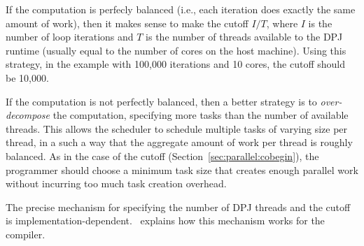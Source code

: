 If the  computation is perfecly balanced (i.e., each
iteration does exactly the same amount of work), then it makes sense
to make the cutoff $I/T$, where $I$ is the number of loop iterations
and $T$ is the number of threads available to the DPJ runtime (usually
equal to the number of cores on the host machine).  Using this
strategy, in the example with 100,000 iterations and 10 cores, the
cutoff should be 10,000.

If the computation is not perfectly balanced, then a better strategy
is to \emph{over-decompose} the computation, specifying more tasks
than the number of available threads.  This allows the scheduler to
schedule multiple tasks of varying size per thread, in a such a way
that the aggregate amount of work per thread is roughly balanced.  As
in the case of the  cutoff
(Section~\ref{sec:parallel:cobegin}), the programmer should choose a
minimum task size that creates enough parallel work without incurring
too much task creation overhead.

The precise mechanism for specifying the number of DPJ threads and the
 cutoff is implementation-dependent.
\installmanual\ explains how this mechanism works for the 
compiler.


